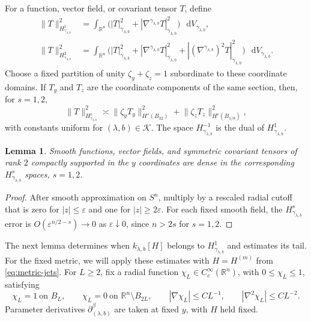 \documentclass[11pt]{article}
\numberwithin{equation}{section}
\newtheorem{lemma}[theorem]{Lemma}
\theoremstyle{remark}
\newcommand{\R}{\mathbb R}
\newcommand{\Sph}{S}
\newcommand{\norm}[1]{\lVert #1\rVert}
\newcommand{\dd}{\mathop{}\!\mathrm{d}}
\begin{document}
For a function, vector field, or covariant tensor \(T\), define
\[
 \begin{aligned}
 \norm{T}_{H^1_{\gamma_{\lambda,b}}}^2
 &=\int_{\R^n}\bigl(
 |T|_{\gamma_{\lambda,b}}^2+
 |\nabla^{\gamma_{\lambda,b}}T|_{\gamma_{\lambda,b}}^2
 \bigr)\,\dd V_{\gamma_{\lambda,b}},\\
 \norm{T}_{H^2_{\gamma_{\lambda,b}}}^2
 &=\int_{\R^n}\bigl(
 |T|_{\gamma_{\lambda,b}}^2+
 |\nabla^{\gamma_{\lambda,b}}T|_{\gamma_{\lambda,b}}^2+
 |(\nabla^{\gamma_{\lambda,b}})^2T|_{\gamma_{\lambda,b}}^2
 \bigr)\,\dd V_{\gamma_{\lambda,b}}.
 \end{aligned}
\]
Choose a fixed partition of unity \(\zeta_y+\zeta_z=1\) subordinate to these
coordinate domains.  If \(T_y\) and \(T_z\) are the coordinate components of
the same section, then, for \(s=1,2\),
\[
 \norm{T}_{H^s_{\gamma_{\lambda,b}}}^2
 \asymp
 \norm{\zeta_yT_y}_{H^s(B_{32})}^2
 +\norm{\zeta_zT_z}_{H^s(B_{1/8})}^2,
\]
with constants uniform for \((\lambda,b)\in\mathcal K\).
The space \(H^{-1}_{\gamma_{\lambda,b}}\) is the dual of
\(H^1_{\gamma_{\lambda,b}}\).

\begin{samepage}
\begin{lemma}\label{lem:euclidean-point-capacity}
Smooth functions, vector fields, and symmetric covariant tensors of rank \(2\)
compactly supported in the \(y\) coordinates are dense in the corresponding
\(H^s_{\gamma_{\lambda,b}}\) spaces, \(s=1,2\).
\end{lemma}

\begin{proof}
After smooth approximation on \(\Sph^n\), multiply by a rescaled radial
cutoff that is zero for \(|z|\le\varepsilon\) and one for
\(|z|\ge2\varepsilon\).
For each fixed smooth field, the \(H^s_{\gamma_{\lambda,b}}\) error is
\(O(\varepsilon^{n/2-s})\to0\) as \(\varepsilon\downarrow0\), since
\(n>2s\) for \(s=1,2\).
\end{proof}
\end{samepage}

The next lemma determines when \(k_{\lambda,b}[H]\) belongs to
\(H^1_{\gamma_{\lambda,b}}\) and estimates its tail.
For the fixed metric, we will apply these estimates with \(H=H^{(m)}\)
from \eqref{eq:metric-jets}.
For \(L\ge2\), fix a radial function
\(\chi_L\in C_c^\infty(\R^n)\), with \(0\le\chi_L\le1\), satisfying
\begin{equation}\label{eq:euclidean-cutoff}
 \chi_L=1\ \text{on }B_L,\qquad
 \chi_L=0\ \text{on }\R^n\setminus B_{2L},\qquad
 |\nabla\chi_L|\le CL^{-1},
\qquad
|\nabla^2\chi_L|\le CL^{-2}.
\end{equation}
Parameter derivatives \(\partial_{(\lambda,b)}^\beta\) are taken at fixed
\(y\), with \(H\) held fixed.
\end{document}
